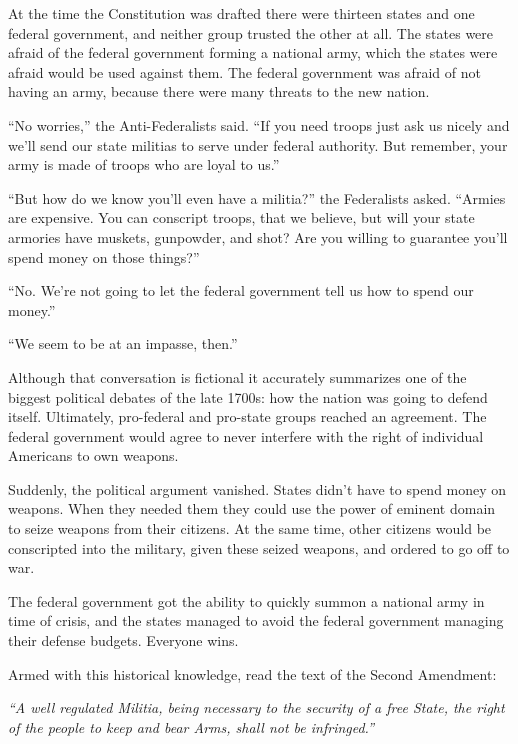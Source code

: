 \documentclass[10pt]{article}
\begin{document}
At the time the Constitution was drafted there were thirteen states and one federal government, and neither group trusted the other at all.  The states were afraid of the federal government forming a national army, which the states were afraid would be used against them.  The federal government was afraid of not having an army, because there were many threats to the new nation.

``No worries,'' the Anti-Federalists said.  ``If you need troops just ask us nicely and we'll send our state militias to serve under federal authority.  But remember, your army is made of troops who are loyal to us.''

``But how do we know you'll even have a militia?'' the Federalists asked.  ``Armies are expensive.  You can conscript troops, that we believe, but will your state armories have muskets, gunpowder, and shot?  Are you willing to guarantee you'll spend money on those things?''

``No.  We're not going to let the federal government tell us how to spend our money.''

``We seem to be at an impasse, then.''

Although that conversation is fictional it accurately summarizes one of the biggest political debates of the late 1700s: how the nation was going to defend itself.  Ultimately, pro-federal and pro-state groups reached an agreement.  The federal government would agree to never interfere with the right of individual Americans to own weapons.

Suddenly, the political argument vanished.  States didn't have to spend money on weapons.  When they needed them they could use the power of eminent domain to seize weapons from their citizens.  At the same time, other citizens would be conscripted into the military, given these seized weapons, and ordered to go off to war.

The federal government got the ability to quickly summon a national army in time of crisis, and the states managed to avoid the federal government managing their defense budgets.  Everyone wins.

Armed with this historical knowledge, read the text of the Second Amendment:

\vspace{0.5cm}
{\it ``A well regulated Militia, being necessary to the security of a free State, the right of the people to keep and bear Arms, shall not be infringed.''}
\vspace{0.5cm}
\end{document}
